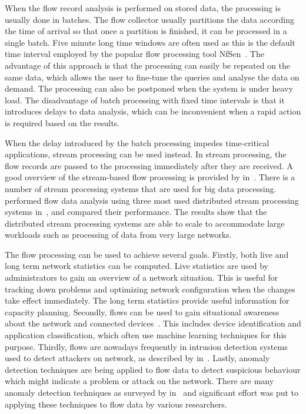 When the flow record analysis is performed on stored data, the processing is usually done in batches. The flow collector usually partitions the data according the time of arrival so that once a partition is finished, it can be processed in a single batch. Five minute long time windows are often used as this is the default time interval employed by the popular flow processing tool NfSen~\cite{Haag-2011-NfSen}. The advantage of this approach is that the processing can easily be repeated on the same data, which allows the user to fine-tune the queries and analyse the data on demand. The processing can also be postponed when the system is under heavy load. The disadvantage of batch processing with fixed time intervals is that it introduces delays to data analysis, which can be inconvenient when a rapid action is required based on the results.

When the delay introduced by the batch processing impedes time-critical applications, stream processing can be used instead. In stream processing, the flow records are passed to the processing immediately after they are received. A good overview of the stream-based flow processing is provided by \citeauthor{Jirsik-2017-Toward} in~\cite{Jirsik-2017-Toward}. There is a number of stream processing systems that are used for big data processing. \citeauthor{Cermak-2016-Performance} performed flow data analysis using three most used distributed stream processing systems in~\cite{Cermak-2016-Performance}, and compared their performance. The results show that the distributed stream processing systems are able to scale to accommodate large workloads such as processing of data from very large networks.

The flow processing can be used to achieve several goals. Firstly, both live and long term network statistics can be computed. Live statistics are used by administrators to gain an overview of a network situation. This is useful for tracking down problems and optimizing network configuration when the changes take effect immediately. The long term statistics provide useful information for capacity planning. Secondly, flows can be used to gain situational awareness about the network and connected devices~\cite{Lastovicka-2017-Situational}. This includes device identification and application classification, which often use machine learning techniques for this purpose. Thirdly, flows are nowadays frequently in intrusion detection systems used to detect attackers on network, as described by \citeauthor{Umer-2017-Flow} in~\cite{Umer-2017-Flow}. Lastly, anomaly detection techniques are being applied to flow data to detect suspicious behaviour which might indicate a problem or attack on the network. There are many anomaly detection techniques as surveyed by \citeauthor{Chandola-2009-Anomaly} in~\cite{Chandola-2009-Anomaly} and significant effort was put to applying these techniques to flow data by various researchers.

